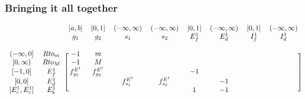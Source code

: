 \documentclass{beamer}
\begin{document}
\begin{frame}[shrink=25]
\frametitle{Bringing it all together}

    \begin{equation*}
        \begin{blockarray}{cccccccccc}
                               &                   & [a,b]             &
            [0,1]              & (-\infty,\infty)  & (-\infty,\infty)  &
            [0,1]              & (-\infty,\infty)  & [0,1]             &
            (-\infty,\infty)  \\ 
                               &                   & g_{1}             &
            g_{2}              & s_{1}             & s_{2}             &
            E_{f}^{1}          & E_{d}^{1}         & I_{f}^{1}         &
            I_{d}^{1} \\
                               &                   &                   &
                               &                   &                   &
                               &                   &                   &
             \\ 
            \begin{block}{cc[cccccccc]}
            {(-\infty,0]}      & Rto_{m}           & -1                &
            m                  &                   &                   &
                               &                   &                   &
             \\
            {[0,\infty)}       & Rto_{M}           & -1                &
            M                  &                   &                   &
                               &                   &                   &
             \\
            {[-1,0]}           & E_{f}^{1}         & f_{g_{1}}^{E^{1}} &
            f_{g_{2}}^{E^{1}}  &                   &                   &
            -1                 &                   &                   &
             \\
            {[0,0]}            & E_{d}^{1}         &                   &
                               & f_{s_{1}}^{E^{1}} & f_{s_{2}}^{E^{1}} &
                               & -1                &                   &
             \\
            {[E_{c}^{1},E_{c}^{1}]} 
                               & E_{b}^{1}         &                   &
                               &                   &                   &
            1                  & -1                &                   &
             \\

\end{block}
\end{blockarray}
\end{equation*}
\end{frame}
\end{document}
